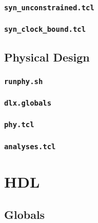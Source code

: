 \subsection{\texttt{syn\_unconstrained.tcl}} \label{app:syn_unconstrained}


\subsection{\texttt{syn\_clock\_bound.tcl}} \label{app:syn_clock_bound}


\newpage
\section{Physical Design}

\subsection{\texttt{runphy.sh}} \label{app:runphy}


\subsection{\texttt{dlx.globals}} \label{app:dlx_globals}


\subsection{\texttt{phy.tcl}} \label{app:phy}


\subsection{\texttt{analyses.tcl}} \label{app:analyses}


\newpage
\chapter{HDL}

\section{Globals}

